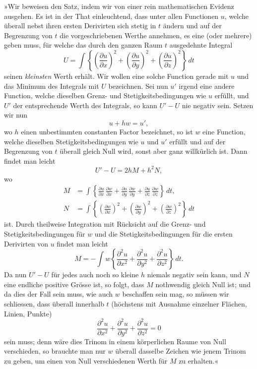 \documentclass{article}
\begin{document}
»Wir beweisen den Satz, indem wir von einer rein mathematischen Evidenz ausgehen. Es ist in der That einleuchtend, dass unter allen Functionen $u$, welche überall nebst ihren ersten Derivirten sich stetig in $t$ ändern und auf der Begrenzung von $t$ die vorgeschriebenen Werthe annehmen, es eine (oder mehrere) geben muss, für welche das durch den ganzen Raum $t$ ausgedehnte Integral
\[
U = \int\left\{\left(\frac{\partial u}{\partial x}\right)^{2} + \left(\frac{\partial u}{\partial y}\right)^{2} + \left(\frac{\partial u}{\partial z}\right)^{2}\right\}\,dt
\]
seinen \emph{kleinsten} Werth erhält. Wir wollen eine solche Function gerade mit $u$ und das Minimum des Integrals mit $U$ bezeichnen. Sei nun $u'$ irgend eine andere Function, welche dieselben Grenz- und Stetigkeitsbedingungen wie $u$ erfüllt, und $U'$ der entsprechende Werth des Integrals, so kann $U'-U$ nie negativ sein. Setzen wir nun
\[
u + hw = u',
\]
wo $h$ einen unbestimmten constanten Factor bezeichnet, so ist $w$ eine Function, welche dieselben Stetigkeitsbedingungen wie $u$ und $u'$ erfüllt und auf der Begrenzung von $t$ überall gleich Null wird, sonst aber ganz willkürlich ist. Dann findet man leicht
\[
U'-U = 2hM + h^{2}N,
\]
wo
\[
\begin{aligned}
M &= \int\left\{\frac{\partial u}{\partial x}\,\frac{\partial w}{\partial x} + \frac{\partial u}{\partial y}\,\frac{\partial w}{\partial y} + \frac{\partial u}{\partial z}\,\frac{\partial w}{\partial z}\right\}\,dt, \\
N &= \int\left\{\left(\frac{\partial w}{\partial x}\right)^{2} + \left(\frac{\partial w}{\partial y}\right)^{2} + \left(\frac{\partial w}{\partial z}\right)^{2}\right\}\,dt
\end{aligned}
\]
ist. Durch theilweise Integration mit Rücksicht auf die Grenz- und Stetigkeitsbedingungen für $w$ und die Stetigkeitsbedingungen für die ersten Derivirten von $u$ findet man leicht
\[
M = -\int w\left\{\frac{\partial^{2}u}{\partial x^{2}} + \frac{\partial^{2}u}{\partial y^{2}} + \frac{\partial^{2}u}{\partial z^{2}}\right\}\,dt.
\]
Da nun $U'-U$ für jedes auch noch so kleine $h$ niemals negativ sein kann, und $N$ eine endliche positive Grösse ist, so folgt, dass $M$ nothwendig gleich Null ist; und da dies der Fall sein muss, wie auch $w$ beschaffen sein mag, so müssen wir schliessen, dass überall innerhalb $t$ (höchstens mit Ausnahme einzelner Flächen, Linien, Punkte)
\[
\frac{\partial^{2}u}{\partial x^{2}} + \frac{\partial^{2}u}{\partial y^{2}} + \frac{\partial^{2}u}{\partial z^{2}} = 0
\]
sein muss; denn wäre dies Trinom in einem körperlichen Raume von Null verschieden, so brauchte man nur $w$ überall dasselbe Zeichen wie jenem Trinom zu geben, um einen von Null verschiedenen Werth für $M$ zu erhalten.«
\end{document}
